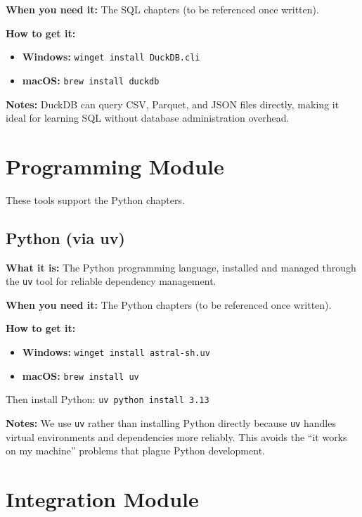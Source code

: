\documentclass[
  letterpaper,
  DIV=11,
  numbers=noendperiod]{scrreprt}
\providecommand{\tightlist}{%
  \setlength{\itemsep}{0pt}\setlength{\parskip}{0pt}}
\begin{document}
\textbf{When you need it:} The SQL chapters (to be referenced once
written).

\textbf{How to get it:}

\begin{itemize}
\tightlist
\item
  \textbf{Windows:} \texttt{winget\ install\ DuckDB.cli}
\item
  \textbf{macOS:} \texttt{brew\ install\ duckdb}
\end{itemize}

\textbf{Notes:} DuckDB can query CSV, Parquet, and JSON files directly,
making it ideal for learning SQL without database administration
overhead.

\section*{Programming Module}\label{programming-module}


These tools support the Python chapters.

\subsection*{Python (via uv)}\label{python-via-uv}

\textbf{What it is:} The Python programming language, installed and
managed through the \texttt{uv} tool for reliable dependency management.

\textbf{When you need it:} The Python chapters (to be referenced once
written).

\textbf{How to get it:}

\begin{itemize}
\tightlist
\item
  \textbf{Windows:} \texttt{winget\ install\ astral-sh.uv}
\item
  \textbf{macOS:} \texttt{brew\ install\ uv}
\end{itemize}

Then install Python: \texttt{uv\ python\ install\ 3.13}

\textbf{Notes:} We use \texttt{uv} rather than installing Python
directly because \texttt{uv} handles virtual environments and
dependencies more reliably. This avoids the ``it works on my machine''
problems that plague Python development.

\section*{Integration Module}\label{integration-module}
\end{document}
